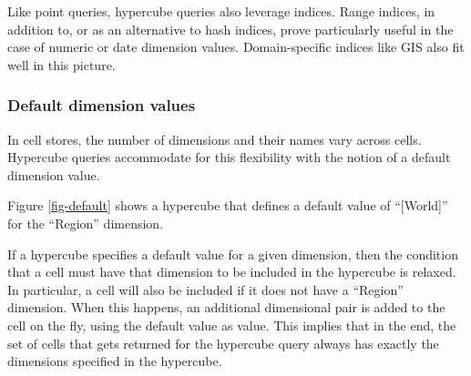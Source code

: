 \documentclass{acm_proc_article-sp}
\begin{document}
Like point queries, hypercube queries also leverage indices. Range indices, in addition to, or as an alternative to hash indices, prove particularly useful in the case of numeric or date dimension values. Domain-specific indices like GIS also fit well in this picture.

\subsubsection{Default dimension values}

In cell stores, the number of dimensions and their names vary across cells. Hypercube queries accommodate for this flexibility with the notion of a default dimension value.

Figure \ref{fig-default} shows a hypercube that defines a default value of ``[World]'' for the ``Region'' dimension.

If a hypercube specifies a default value for a given dimension, then the condition that a cell must have that dimension to be included in the hypercube is relaxed. In particular, a cell will also be included if it does not have a ``Region'' dimension. When this happens, an additional dimensional pair is added to the cell on the fly, using the default value as value. This implies that in the end, the set of cells that gets returned for the hypercube query always has exactly the dimensions specified in the hypercube.
\end{document}
